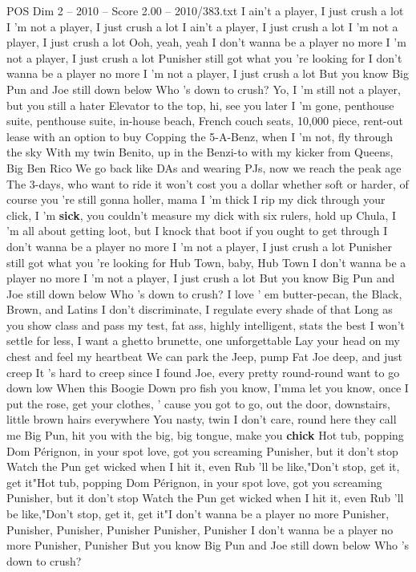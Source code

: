 \begin{textsample}{POS Dim 2 – 2010 – Score 2.00 – 2010/383.txt}  \label{ex:f2_pos_035}
I ain't a player, I just crush a lot I 'm not a player, I just crush a lot I ain't a player, I just crush a lot I 'm not a player, I just crush a lot Ooh, yeah, yeah I don't wanna be a player no more I 'm not a player, I just crush a lot Punisher still got what you 're looking for I don't wanna be a player no more I 'm not a player, I just crush a lot But you know Big Pun and Joe still down below Who 's down to crush?
Yo, I 'm still not a player, but you still a hater Elevator to the top, hi, see you later I 'm gone, penthouse suite, penthouse suite, in-house beach, French couch seats, 10,000 piece, rent-out lease with an option to buy Copping the 5-A-Benz, when I 'm not, fly through the sky With my twin Benito, up in the Benzi-to with my kicker from Queens, Big Ben Rico We go back like DAs and wearing PJs, now we reach the peak age The 3-days, who want to ride it won't cost you a dollar whether soft or harder, of course you 're still gonna holler, mama I 'm thick I rip my dick through your click, I 'm \textbf{sick}, you couldn't measure my dick with six rulers, hold up Chula, I 'm all about getting loot, but I knock that boot if you ought to get through I don't wanna be a player no more I 'm not a player, I just crush a lot Punisher still got what you 're looking for Hub Town, baby, Hub Town I don't wanna be a player no more I 'm not a player, I just crush a lot But you know Big Pun and Joe still down below Who 's down to crush?
I love ' em butter-pecan, the Black, Brown, and Latins I don't discriminate, I regulate every shade of that Long as you show class and pass my test, fat ass, highly intelligent, stats the best I won't settle for less, I want a ghetto brunette, one unforgettable Lay your head on my chest and feel my heartbeat We can park the Jeep, pump Fat Joe deep, and just creep It 's hard to creep since I found Joe, every pretty round-round want to go down low When this Boogie Down pro fish you know, I'mma let you know, once I put the rose, get your clothes, ' cause you got to go, out the door, downstairs, little brown hairs everywhere You nasty, twin I don't care, round here they call me Big Pun, hit you with the big, big tongue, make you \textbf{chick} Hot tub, popping Dom Pérignon, in your spot love, got you screaming Punisher, but it don't stop Watch the Pun get wicked when I hit it, even Rub 'll be like,"Don't stop, get it, get it"Hot tub, popping Dom Pérignon, in your spot love, got you screaming Punisher, but it don't stop Watch the Pun get wicked when I hit it, even Rub 'll be like,"Don't stop, get it, get it"I don't wanna be a player no more Punisher, Punisher, Punisher, Punisher Punisher, Punisher I don't wanna be a player no more Punisher, Punisher But you know Big Pun and Joe still down below Who 's down to crush?

\end{textsample}

